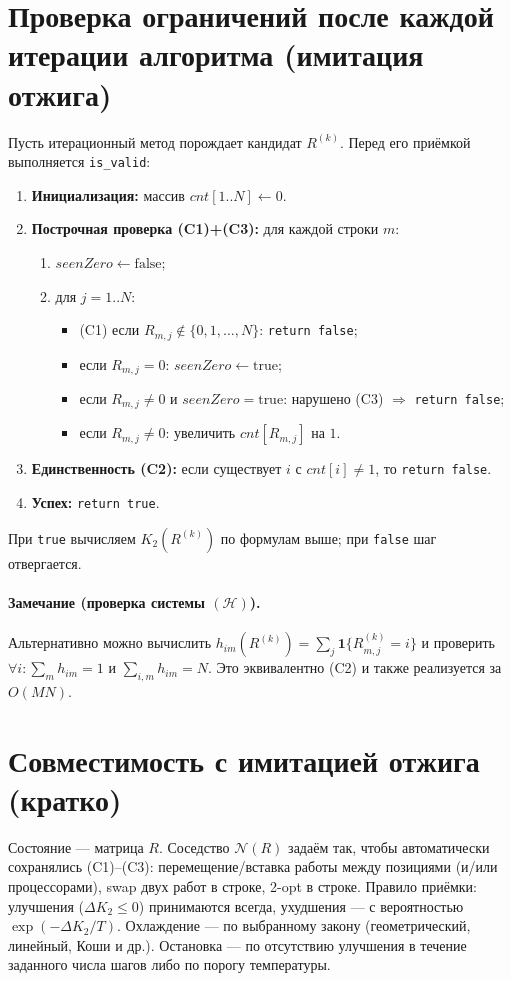 \documentclass[a4paper,12pt]{article}
\newcommand{\1}{\mathbf{1}} %
\begin{document}
\section{Проверка ограничений после каждой итерации алгоритма (имитация отжига)}
Пусть итерационный метод порождает кандидат $R^{(k)}$. Перед его приёмкой выполняется \texttt{is\_valid}:
\begin{enumerate}
  \item \textbf{Инициализация:} массив $cnt[1..N]\gets 0$.
  \item \textbf{Построчная проверка (C1)+(C3):} для каждой строки $m$:
  \begin{enumerate}
    \item $seenZero\gets \text{false}$;
    \item для $j=1..N$:
    \begin{itemize}
      \item (C1) если $R_{m,j}\notin\{0,1,\dots,N\}$: \texttt{return false};
      \item если $R_{m,j}=0$: $seenZero\gets \text{true}$;
      \item если $R_{m,j}\neq 0$ и $seenZero=\text{true}$: нарушено (C3) $\Rightarrow$ \texttt{return false};
      \item если $R_{m,j}\neq 0$: увеличить $cnt[R_{m,j}]$ на $1$.
    \end{itemize}
  \end{enumerate}
  \item \textbf{Единственность (C2):} если существует $i$ с $cnt[i]\neq 1$, то \texttt{return false}.
  \item \textbf{Успех:} \texttt{return true}.
\end{enumerate}
При \texttt{true} вычисляем $K_2(R^{(k)})$ по формулам выше; при \texttt{false} шаг отвергается.

\paragraph{Замечание (проверка системы $(\mathcal H)$).}
Альтернативно можно вычислить $h_{im}(R^{(k)})=\sum_{j}\1\{R^{(k)}_{m,j}=i\}$ и проверить
$\forall i:\sum_m h_{im}=1$ и $\sum_{i,m} h_{im}=N$. Это эквивалентно (C2) и также реализуется за $O(MN)$.

\section{Совместимость с имитацией отжига (кратко)}
Состояние — матрица $R$. Соседство $\mathcal N(R)$ задаём так, чтобы автоматически сохранялись (C1)–(C3): перемещение/вставка работы между позициями (и/или процессорами), swap двух работ в строке, 2-opt в строке. Правило приёмки: улучшения ($\Delta K_2\le 0$) принимаются всегда, ухудшения — с вероятностью $\exp(-\Delta K_2/T)$. Охлаждение — по выбранному закону (геометрический, линейный, Коши и др.). Остановка — по отсутствию улучшения в течение заданного числа шагов либо по порогу температуры.
\end{document}
